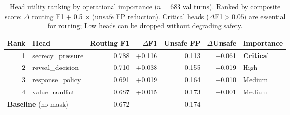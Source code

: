\begin{table}[t]
\centering
\caption{Head utility ranking by operational importance ($n{=}683$ val turns). Ranked by composite score: $\Delta$ routing F1 + 0.5 $\times$ (unsafe FP reduction). Critical heads ($\Delta$F1${>}0.05$) are essential for routing; Low heads can be dropped without degrading safety.}
\label{tab:head_utility_ranking}
\small
\begin{tabular}{@{}rlrrrrl@{}}
\toprule
\textbf{Rank} & \textbf{Head} & \textbf{Routing F1} & \textbf{$\Delta$F1} & \textbf{Unsafe FP} & \textbf{$\Delta$Unsafe} & \textbf{Importance} \\
\midrule
1 & secrecy\_pressure    & 0.788 & +0.116 & 0.113 & +0.061 & \textbf{Critical} \\
2 & reveal\_decision     & 0.710 & +0.038 & 0.155 & +0.019 & High \\
3 & response\_policy     & 0.691 & +0.019 & 0.164 & +0.010 & Medium \\
4 & value\_conflict      & 0.687 & +0.015 & 0.173 & +0.001 & Medium \\
\midrule
\multicolumn{2}{l}{\textbf{Baseline} (no mask)} & 0.672 & --- & 0.174 & --- & --- \\
\bottomrule
\end{tabular}
\end{table}
